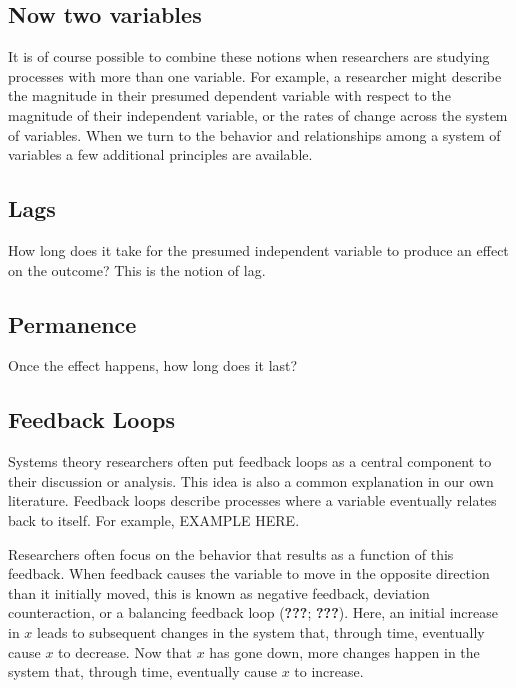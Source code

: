\documentclass[english,,man]{apa6}
\theoremstyle{definition}
\theoremstyle{definition}
\theoremstyle{definition}
\theoremstyle{remark}
\begin{document}
\hypertarget{now-two-variables}{%
\subsection{Now two variables}\label{now-two-variables}}

It is of course possible to combine these notions when researchers are
studying processes with more than one variable. For example, a
researcher might describe the magnitude in their presumed dependent
variable with respect to the magnitude of their independent variable, or
the rates of change across the system of variables. When we turn to the
behavior and relationships among a system of variables a few additional
principles are available.

\hypertarget{lags}{%
\subsection{Lags}\label{lags}}

How long does it take for the presumed independent variable to produce
an effect on the outcome? This is the notion of lag.

\hypertarget{permanence}{%
\subsection{Permanence}\label{permanence}}

Once the effect happens, how long does it last?

\hypertarget{feedback-loops}{%
\subsection{Feedback Loops}\label{feedback-loops}}

Systems theory researchers often put feedback loops as a central
component to their discussion or analysis. This idea is also a common
explanation in our own literature. Feedback loops describe processes
where a variable eventually relates back to itself. For example, EXAMPLE
HERE.

Researchers often focus on the behavior that results as a function of
this feedback. When feedback causes the variable to move in the opposite
direction than it initially moved, this is known as negative feedback,
deviation counteraction, or a balancing feedback loop ({\textbf{???}};
{\textbf{???}}). Here, an initial increase in \(x\) leads to subsequent
changes in the system that, through time, eventually cause \(x\) to
decrease. Now that \(x\) has gone down, more changes happen in the
system that, through time, eventually cause \(x\) to increase.
\end{document}
